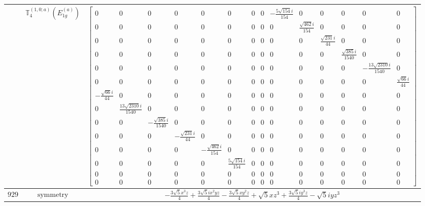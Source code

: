 \documentclass[fleqn,8pt,landscape]{jsarticle}
\begin{document}
\begin{longtable}{ccc}
$  $ & $ \mathbb{T}_{4}^{(1,0;a)}(E_{1g}^{(a)}) $ & $ \begin{bmatrix} 0 & 0 & 0 & 0 & 0 & 0 & 0 & 0 & - \frac{5 \sqrt{154} i}{154} & 0 & 0 & 0 & 0 & 0 \\ 0 & 0 & 0 & 0 & 0 & 0 & 0 & 0 & 0 & \frac{\sqrt{462} i}{154} & 0 & 0 & 0 & 0 \\ 0 & 0 & 0 & 0 & 0 & 0 & 0 & 0 & 0 & 0 & \frac{\sqrt{231} i}{44} & 0 & 0 & 0 \\ 0 & 0 & 0 & 0 & 0 & 0 & 0 & 0 & 0 & 0 & 0 & \frac{\sqrt{385} i}{1540} & 0 & 0 \\ 0 & 0 & 0 & 0 & 0 & 0 & 0 & 0 & 0 & 0 & 0 & 0 & - \frac{13 \sqrt{2310} i}{1540} & 0 \\ 0 & 0 & 0 & 0 & 0 & 0 & 0 & 0 & 0 & 0 & 0 & 0 & 0 & \frac{\sqrt{66} i}{44} \\ - \frac{\sqrt{66} i}{44} & 0 & 0 & 0 & 0 & 0 & 0 & 0 & 0 & 0 & 0 & 0 & 0 & 0 \\ 0 & \frac{13 \sqrt{2310} i}{1540} & 0 & 0 & 0 & 0 & 0 & 0 & 0 & 0 & 0 & 0 & 0 & 0 \\ 0 & 0 & - \frac{\sqrt{385} i}{1540} & 0 & 0 & 0 & 0 & 0 & 0 & 0 & 0 & 0 & 0 & 0 \\ 0 & 0 & 0 & - \frac{\sqrt{231} i}{44} & 0 & 0 & 0 & 0 & 0 & 0 & 0 & 0 & 0 & 0 \\ 0 & 0 & 0 & 0 & - \frac{\sqrt{462} i}{154} & 0 & 0 & 0 & 0 & 0 & 0 & 0 & 0 & 0 \\ 0 & 0 & 0 & 0 & 0 & \frac{5 \sqrt{154} i}{154} & 0 & 0 & 0 & 0 & 0 & 0 & 0 & 0 \\ 0 & 0 & 0 & 0 & 0 & 0 & 0 & 0 & 0 & 0 & 0 & 0 & 0 & 0 \\ 0 & 0 & 0 & 0 & 0 & 0 & 0 & 0 & 0 & 0 & 0 & 0 & 0 & 0 \end{bmatrix} $ \\ \hline
$ 929 $ & $ \text{symmetry} $ & $ - \frac{3 \sqrt{5} x^{3} z}{4} + \frac{3 \sqrt{5} i x^{2} y z}{4} - \frac{3 \sqrt{5} x y^{2} z}{4} + \sqrt{5} x z^{3} + \frac{3 \sqrt{5} i y^{3} z}{4} - \sqrt{5} i y z^{3} $ \\

\end{longtable}
\end{document}
